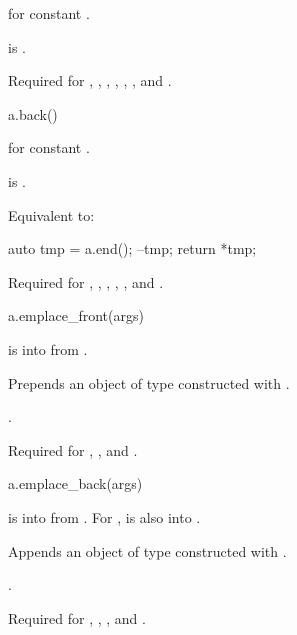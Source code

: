 \begin{itemdescr}
\pnum
\result
{} for constant .

\pnum
\hardexpects
{} is .

\pnum
\returns
{}

\pnum
\remarks
Required for
,
,
,
,
,
, and
.
\end{itemdescr}

\begin{itemdecl}
a.back()
\end{itemdecl}

\begin{itemdescr}
\pnum
\result
{} for constant .

\pnum
\hardexpects
{} is .

\pnum
\effects
Equivalent to:
\begin{codeblock}
auto tmp = a.end();
--tmp;
return *tmp;
\end{codeblock}

\pnum
\remarks
Required for
,
,
,
,
, and
.
\end{itemdescr}

\begin{itemdecl}
a.emplace_front(args)
\end{itemdecl}

\begin{itemdescr}
\pnum
\result
{}

\pnum
\expects
{} is  into  from .

\pnum
\effects
Prepends an object of type 
constructed with .

\pnum
\returns
{}.

\pnum
\remarks
Required for
,
, and
.
\end{itemdescr}

\begin{itemdecl}
a.emplace_back(args)
\end{itemdecl}

\begin{itemdescr}
\pnum
\result
{}

\pnum
\expects
{} is  into  from .
For ,
 is also  into .

\pnum
\effects
Appends an object of type 
constructed with .

\pnum
\returns
{}.

\pnum
\remarks
Required for
,
,
, and
.
\end{itemdescr}

